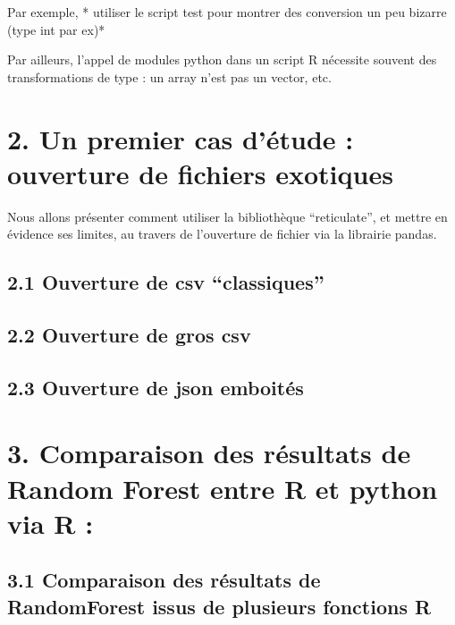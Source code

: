 \documentclass[]{article}
\begin{document}
Par exemple, * utiliser le script test pour montrer des conversion un
peu bizarre (type int par ex)*

Par ailleurs, l'appel de modules python dans un script R nécessite
souvent des transformations de type : un array n'est pas un vector, etc.

\hypertarget{un-premier-cas-detude-ouverture-de-fichiers-exotiques}{%
\section{2. Un premier cas d'étude : ouverture de fichiers
exotiques}\label{un-premier-cas-detude-ouverture-de-fichiers-exotiques}}

Nous allons présenter comment utiliser la bibliothèque ``reticulate'',
et mettre en évidence ses limites, au travers de l'ouverture de fichier
via la librairie pandas.

\hypertarget{ouverture-de-csv-classiques}{%
\subsection{2.1 Ouverture de csv
``classiques''}\label{ouverture-de-csv-classiques}}

\hypertarget{ouverture-de-gros-csv}{%
\subsection{2.2 Ouverture de gros csv}\label{ouverture-de-gros-csv}}

\hypertarget{ouverture-de-json-emboites}{%
\subsection{2.3 Ouverture de json
emboités}\label{ouverture-de-json-emboites}}

\hypertarget{comparaison-des-resultats-de-random-forest-entre-r-et-python-via-r}{%
\section{3. Comparaison des résultats de Random Forest entre R et python
via R
:}\label{comparaison-des-resultats-de-random-forest-entre-r-et-python-via-r}}

\hypertarget{comparaison-des-resultats-de-randomforest-issus-de-plusieurs-fonctions-r}{%
\subsection{3.1 Comparaison des résultats de RandomForest issus de
plusieurs fonctions
R}\label{comparaison-des-resultats-de-randomforest-issus-de-plusieurs-fonctions-r}}
\end{document}
